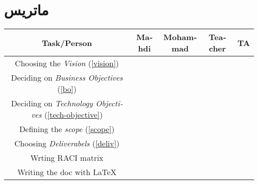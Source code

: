 \chapter{ماتریس }
\begin{table}[H]
\begin{latin}
\begin{adjustbox}{width=\textwidth}
\begin{tabular}{|c|c|c|c|c|}
\hline
Task/Person & Mahdi & Mohammad & Teacher & TA \\
\hline
\hline

Choosing the \textit{Vision} (\ref{vision}) &&&& \\
\hline

Deciding on \textit{Business Objectives} (\ref{bo}) &&&& \\
\hline

Deciding on \textit{Technology Objectives} (\ref{tech-objective}) &&&& \\
\hline

Defining the \textit{scope} (\ref{scope}) &&&& \\
\hline

Choosing \textit{Deliverabels} (\ref{deliv}) &&&& \\
\hline

Wrting RACI matrix &&&& \\
\hline
Writing the doc with \LaTeX &&&& \\
\hline
\end{tabular}
\end{adjustbox}
\end{latin}
\end{table}
